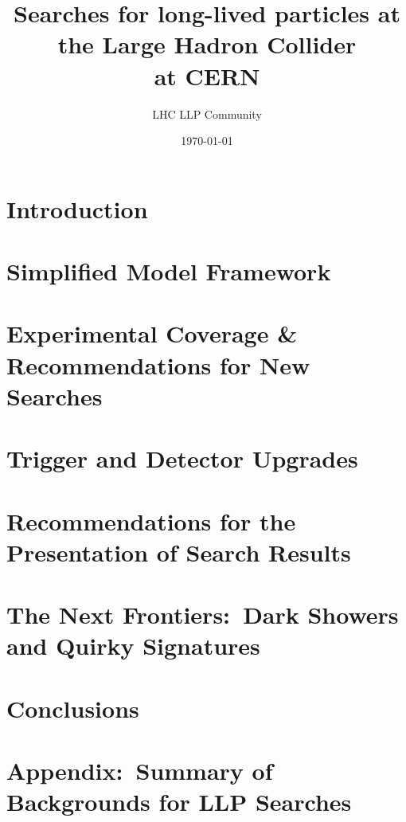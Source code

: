 \documentclass[a4paper,debug,notitlepage,nobib]{tufte-book}
\title{Searches for long-lived particles at the Large Hadron Collider \\ \smallskip \noindent at CERN}
\author{LHC LLP Community}
\date{\today}
\begin{document}
\setcounter{secnumdepth}{3} %



\setcounter{tocdepth}{1}
\tableofcontents
 

\chapter{Introduction}
\label{sec:Introduction}


\chapter{Simplified Model Framework}
\label{sec:simplifiedmodel}


\chapter{Experimental Coverage \& Recommendations for New Searches}
\label{sec:experimentcoverage}


\chapter{Trigger and Detector Upgrades}
\label{sec:triggers}


\chapter{Recommendations for the Presentation of Search Results}
\label{sec:recommendations}


\chapter{The Next Frontiers:~Dark Showers and Quirky Signatures}
\label{sec:showers}



\chapter{Conclusions}
\label{sec:conclusions}

 

\appendix




\chapter{Appendix:~Summary of Backgrounds for LLP Searches}
\label{sec:backgrounds}

\end{document}
